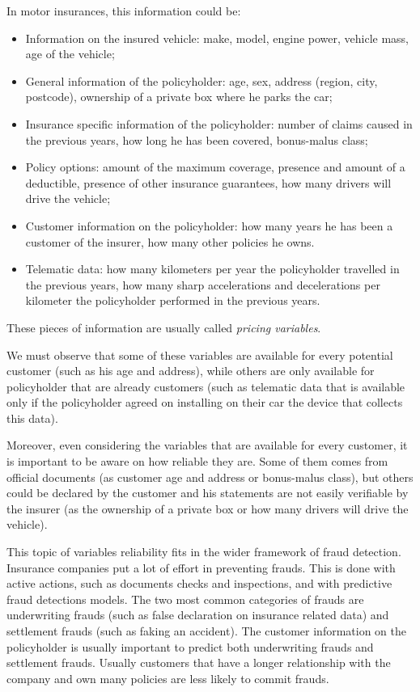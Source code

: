 \documentclass[a4paper, nobind]{templates/ociamthesis}
\providecommand{\tightlist}{%
  \setlength{\itemsep}{0pt}\setlength{\parskip}{0pt}}
\theoremstyle{definition}
\theoremstyle{definition}
\theoremstyle{definition}
\theoremstyle{remark}
\begin{document}
In motor insurances, this information could be:

\begin{itemize}
\tightlist
\item
  Information on the insured vehicle: make, model, engine power, vehicle mass, age of the vehicle;
\item
  General information of the policyholder: age, sex, address (region, city, postcode), ownership of a private box where he parks the car;
\item
  Insurance specific information of the policyholder: number of claims caused in the previous years, how long he has been covered, bonus-malus class;
\item
  Policy options: amount of the maximum coverage, presence and amount of a deductible, presence of other insurance guarantees, how many drivers will drive the vehicle;
\item
  Customer information on the policyholder: how many years he has been a customer of the insurer, how many other policies he owns.
\item
  Telematic data: how many kilometers per year the policyholder travelled in the previous years, how many sharp accelerations and decelerations per kilometer the policyholder performed in the previous years.
\end{itemize}

These pieces of information are usually called \emph{pricing variables}.

We must observe that some of these variables are available for every potential customer (such as his age and address), while others are only available for policyholder that are already customers (such as telematic data that is available only if the policyholder agreed on installing on their car the device that collects this data).

Moreover, even considering the variables that are available for every customer, it is important to be aware on how reliable they are. Some of them comes from official documents (as customer age and address or bonus-malus class), but others could be declared by the customer and his statements are not easily verifiable by the insurer (as the ownership of a private box or how many drivers will drive the vehicle).

This topic of variables reliability fits in the wider framework of fraud detection. Insurance companies put a lot of effort in preventing frauds. This is done with active actions, such as documents checks and inspections, and with predictive fraud detections models. The two most common categories of frauds are underwriting frauds (such as false declaration on insurance related data) and settlement frauds (such as faking an accident). The customer information on the policyholder is usually important to predict both underwriting frauds and settlement frauds. Usually customers that have a longer relationship with the company and own many policies are less likely to commit frauds.
\end{document}
